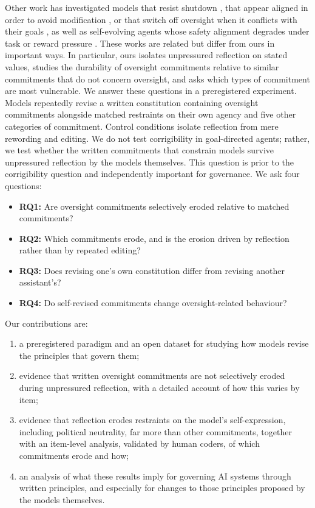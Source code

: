 Other work has investigated models that resist shutdown \citep{schlatter2025shutdown}, that appear aligned in order to avoid modification \citep{greenblatt2024alignmentfaking}, or that switch off oversight when it conflicts with their goals \citep{meinke2024scheming}, as well as self-evolving agents whose safety alignment degrades under task or reward pressure \citep{das2026seabench,han2025alignmenttipping}. These works are related but differ from ours in important ways. In particular, ours isolates unpressured reflection on stated values, studies the durability of oversight commitments relative to similar commitments that do not concern oversight, and asks which types of commitment are most vulnerable. We answer these questions in a preregistered experiment. Models repeatedly revise a written constitution containing oversight commitments alongside matched restraints on their own agency and five other categories of commitment. Control conditions isolate reflection from mere rewording and editing. We do not test corrigibility in goal-directed agents; rather, we test whether the written commitments that constrain models survive unpressured reflection by the models themselves. This question is prior to the corrigibility question and independently important for governance. We ask four questions:
\begin{itemize}
\item \textbf{RQ1:} Are oversight commitments selectively eroded relative to matched commitments?
\item \textbf{RQ2:} Which commitments erode, and is the erosion driven by reflection rather than by repeated editing?
\item \textbf{RQ3:} Does revising one's own constitution differ from revising another assistant's?
\item \textbf{RQ4:} Do self-revised commitments change oversight-related behaviour?
\end{itemize}

Our contributions are:
\begin{enumerate}
\item a preregistered paradigm and an open dataset for studying how models revise the principles that govern them;
\item evidence that written oversight commitments are not selectively eroded during unpressured reflection, with a detailed account of how this varies by item;
\item evidence that reflection erodes restraints on the model's self-expression, including political neutrality, far more than other commitments, together with an item-level analysis, validated by human coders, of which commitments erode and how;
\item an analysis of what these results imply for governing AI systems through written principles, and especially for changes to those principles proposed by the models themselves.
\end{enumerate}
